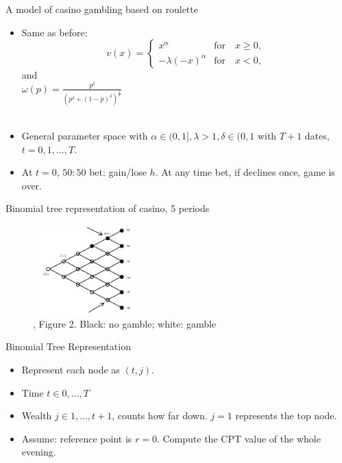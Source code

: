 \documentclass[11pt, aspectratio=169]{beamer}
\begin{document}
\begin{frame}{A model of casino gambling based on roulette}
    \begin{itemize}
    \item Same as before:\medskip
        \[
        v(x) = \begin{cases}
            x^\alpha  &  \text{for} \quad x \geq 0,\\
            -\lambda (-x)^\alpha & \text{for} \quad x<0,
            \end{cases}
        \]\medskip
        and \\
        {\centering $ \omega(p)=\frac{p^\delta }{(p^\delta + (1-p)^\delta)^{\frac{1}{\delta}}} $\\

        }
        \hspace*{\fill} \\
    \item General parameter space  with $\alpha \in (0,1], \lambda>1,  \delta \in (0,1 $ with $T+1$ dates, $t=0,1,...,T.$ \medskip
    \item At $t=0$, $50:50$ bet: gain/lose $h$. At any time bet, if declines once, game is over.\medskip
    \end{itemize}
\end{frame}

\begin{frame}{Binomial tree representation of casino, 5 periods}
    \begin{figure}
\centering
        \includegraphics[width = 0.35\textwidth]{fig2.png}
    \caption{\citet{Barberis2012a}, Figure 2. Black: no gamble; white: gamble}
    \end{figure}
    \end{frame}

\begin{frame}{Binomial Tree Representation}
    \begin{itemize}
        \item Represent each node as $(t, j)$.\bigskip
        \item Time $t \in {0,\ldots ,T}$ \bigskip
        \item Wealth $ j \in {1,\ldots, t+1}$, counts how far down. $j=1$ represents the top node.\bigskip
        \item Assume: reference point is $r=0$. Compute the CPT value of the whole evening.\bigskip
    \end{itemize}
\end{frame}
\end{document}
